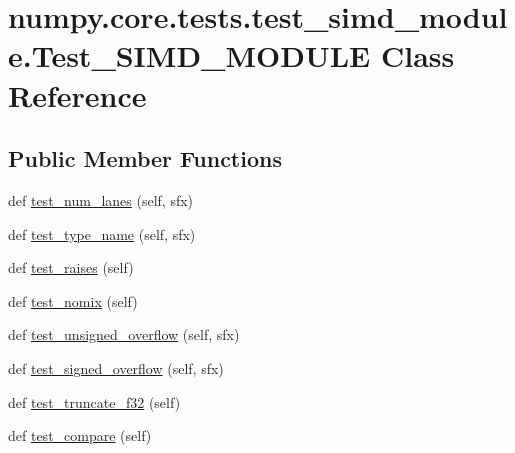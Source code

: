 \hypertarget{classnumpy_1_1core_1_1tests_1_1test__simd__module_1_1Test__SIMD__MODULE}{}\section{numpy.\+core.\+tests.\+test\+\_\+simd\+\_\+module.\+Test\+\_\+\+S\+I\+M\+D\+\_\+\+M\+O\+D\+U\+LE Class Reference}
\label{classnumpy_1_1core_1_1tests_1_1test__simd__module_1_1Test__SIMD__MODULE}
\subsection*{Public Member Functions}
\begin{DoxyCompactItemize}
\item 
def \hyperlink{classnumpy_1_1core_1_1tests_1_1test__simd__module_1_1Test__SIMD__MODULE_af1ffda3a55a83786cc7f35adb12559c0}{test\+\_\+num\+\_\+lanes} (self, sfx)
\item 
def \hyperlink{classnumpy_1_1core_1_1tests_1_1test__simd__module_1_1Test__SIMD__MODULE_a26fdb8a7e6a967b317fcc24396912a56}{test\+\_\+type\+\_\+name} (self, sfx)
\item 
def \hyperlink{classnumpy_1_1core_1_1tests_1_1test__simd__module_1_1Test__SIMD__MODULE_a9cdc4528f11e34aaa6b995463e118bbf}{test\+\_\+raises} (self)
\item 
def \hyperlink{classnumpy_1_1core_1_1tests_1_1test__simd__module_1_1Test__SIMD__MODULE_ac3374fc6ca42777c78ff311715d95312}{test\+\_\+nomix} (self)
\item 
def \hyperlink{classnumpy_1_1core_1_1tests_1_1test__simd__module_1_1Test__SIMD__MODULE_a91ef0ef990d6dbc2c395ff580ebdb172}{test\+\_\+unsigned\+\_\+overflow} (self, sfx)
\item 
def \hyperlink{classnumpy_1_1core_1_1tests_1_1test__simd__module_1_1Test__SIMD__MODULE_a34d47da88f9e88a934ab772fbf794cd1}{test\+\_\+signed\+\_\+overflow} (self, sfx)
\item 
def \hyperlink{classnumpy_1_1core_1_1tests_1_1test__simd__module_1_1Test__SIMD__MODULE_acc3658972e53609e7de423c8175ae36a}{test\+\_\+truncate\+\_\+f32} (self)
\item 
def \hyperlink{classnumpy_1_1core_1_1tests_1_1test__simd__module_1_1Test__SIMD__MODULE_a6ff4408742eb22aedaa72f1b641d93b3}{test\+\_\+compare} (self)
\end{DoxyCompactItemize}
